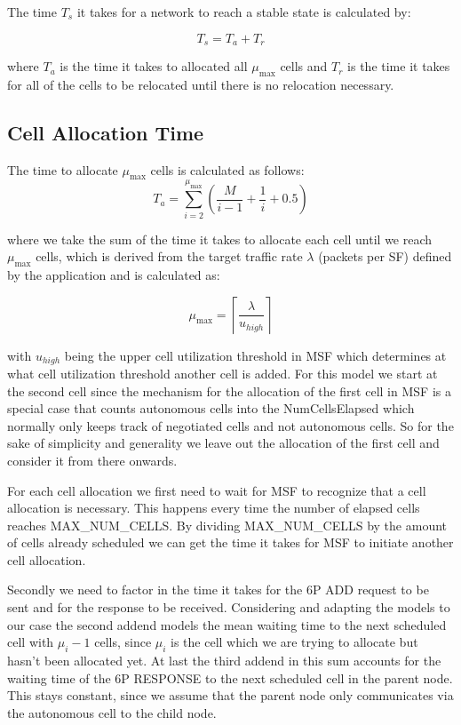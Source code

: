 \documentclass{comnets-thesis}
\begin{document}
The time $T_s$ it takes for a network to reach a stable state is calculated by:

\begin{equation}
    T_s = T_a + T_r
    \label{eq:t_s}
\end{equation}

where $T_a$ is the time it takes to allocated all $\mu_{\max}$ cells and $T_r$ is the time it takes for all of the cells to be relocated until there is no relocation necessary.


\subsection{ Cell Allocation Time }
The time to allocate $\mu_{\max}$ cells is calculated as follows:
\begin{equation}
    T_a = \sum_{i=2}^{\mu_{\max}} \left( \frac{M}{i - 1} + \frac{1}{i} + 0.5 \right)
    \label{eq:t_a-allocation-time}
\end{equation}

where we take the sum of the time it takes to allocate each cell until we reach $\mu_{\max}$ cells, which is derived from the target traffic rate $\lambda$ (packets per \ac{SF}) defined by the application and is calculated as:

$$\mu_{\max} = \left\lceil \frac{\lambda}{u_{high}} \right\rceil$$ 

with $u_{high}$ being the upper cell utilization threshold in \ac{MSF} which determines at what cell utilization threshold another cell is added.
For this model we start at the second cell since the mechanism for the allocation of the first cell in \ac{MSF} is a special case that counts autonomous cells into the NumCellsElapsed which normally only keeps track of negotiated cells and not autonomous cells. So for the sake of simplicity and generality we leave out the allocation of the first cell and consider it from there onwards.

For each cell allocation we first need to wait for \ac{MSF} to recognize that a cell allocation is necessary. This happens every time the number of elapsed cells reaches MAX\_NUM\_CELLS. By dividing MAX\_NUM\_CELLS by the amount of cells already scheduled we can get the time it takes for \ac{MSF} to initiate another cell allocation.

Secondly we need to factor in the time it takes for the 6P ADD request to be sent and for the response to be received. Considering \cite{Tasixptransactiontime} and adapting the models to our case the second addend models the mean waiting time to the next scheduled cell with $\mu_i - 1$ cells, since $\mu_i$ is the cell which we are trying to allocate but hasn't been allocated yet. 
At last the third addend in this sum accounts for the waiting time of the 6P RESPONSE to the next scheduled cell in the parent node. This stays constant, since we assume that the parent node only communicates via the autonomous cell to the child node.
\end{document}
